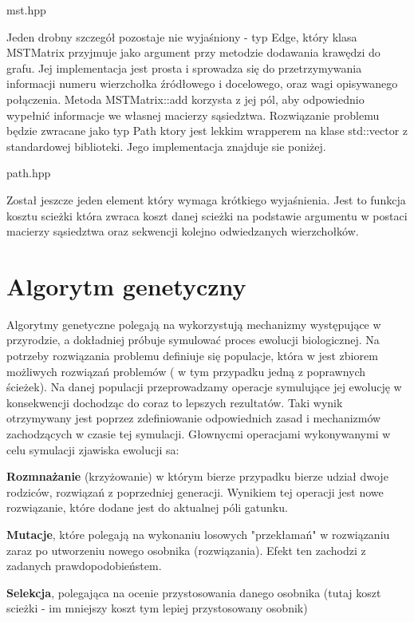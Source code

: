 \documentclass[polish,polish,a4paper]{article}
\begin{document}

{mst.hpp}

Jeden drobny szczegół pozostaje nie wyjaśniony - typ Edge, który klasa MSTMatrix przyjmuje jako argument przy metodzie dodawania krawędzi do grafu.
Jej implementacja jest prosta i sprowadza się do przetrzymywania informacji numeru wierzchołka źródłowego i docelowego, oraz wagi opisywanego połączenia.
Metoda MSTMatrix::add korzysta z jej pól, aby odpowiednio wypełnić informacje we własnej macierzy sąsiedztwa.
Rozwiązanie problemu będzie zwracane jako typ Path ktory jest lekkim wrapperem na klase std::vector z standardowej biblioteki.
Jego implementacja znajduje sie poniżej.


{path.hpp}

Został jeszcze jeden element który wymaga krótkiego wyjaśnienia. Jest to funkcja kosztu scieżki która zwraca koszt danej scieżki na podstawie argumentu w postaci macierzy sąsiedztwa
oraz sekwencji kolejno odwiedzanych wierzchołków.

\section{Algorytm genetyczny}
\par Algorytmy genetyczne polegają na wykorzystują mechanizmy występujące w przyrodzie, a dokładniej próbuje symulować proces ewolucji biologicznej.
Na potrzeby rozwiązania problemu definiuje się populacje, która w jest zbiorem możliwych rozwiązań problemów ( w tym przypadku jedną z poprawnych ścieżek).
Na danej populacji przeprowadzamy operacje symulujące jej ewolucję w konsekwencji dochodząc do coraz to lepszych rezultatów. Taki wynik otrzymywany jest
poprzez zdefiniowanie odpowiednich zasad i mechanizmów zachodzących w czasie tej symulacji. Głownycmi operacjami wykonywanymi w celu symulacji zjawiska
ewolucji sa:

\par \textbf{Rozmnażanie}
(krzyżowanie) w którym bierze przypadku bierze udział dwoje rodziców, rozwiązań z poprzedniej generacji. Wynikiem tej operacji jest nowe rozwiązanie,
które dodane jest do aktualnej póli gatunku.

\par \textbf{Mutacje},
które polegają na wykonaniu losowych "przekłamań" w rozwiązaniu zaraz po utworzeniu nowego osobnika (rozwiązania).
Efekt ten zachodzi z zadanych prawdopodobieństem.

\par \textbf{Selekcja},
polegająca na ocenie przystosowania danego osobnika (tutaj koszt scieżki - im mniejszy koszt tym lepiej przystosowany osobnik)
\end{document}
